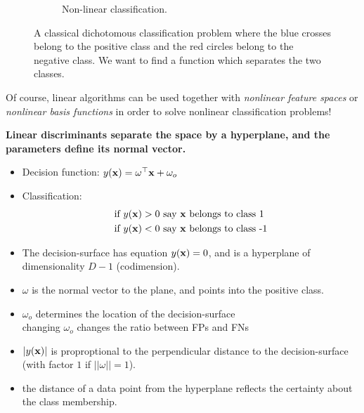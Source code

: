 \begin{figure}
\begin{subfigure}[b]{0.45\textwidth}
		\caption{Non-linear classification.}
	\end{subfigure}
	\caption{A classical dichotomous classification problem where the blue crosses belong to the positive class and the red circles belong to the negative class. We want to find a function which separates the two classes.}
\end{figure}

Of course, linear algorithms can be used together with \emph{nonlinear feature spaces} or \emph{nonlinear basis functions} in order to solve nonlinear classification problems!


\textbf{Linear discriminants separate the space by a hyperplane, and the parameters define its normal vector.} 

\begin{itemize}
\item Decision function: $y({\mathbf{x}})=\omega^\top {\mathbf{x}} + \omega_o$
\item  Classification: \begin{align}
\mbox{if~}y({\mathbf{x}})>0 & \mbox{~say ${\mathbf{x}}$ belongs to class 1}\\
\mbox{if~}y({\mathbf{x}})<0 & \mbox{~say ${\mathbf{x}}$ belongs to class -1}\\
 \end{align}
\item The decision-surface has equation $y({\mathbf{x}})=0$, and is a hyperplane of dimensionality $D-1$ (codimension).
\item  $\omega$ is the normal vector to the plane, and points into the positive class.
\item  $\omega_o$ determines the location of the decision-surface \\
	   changing $\omega_o$ changes the ratio between FPs and FNs
\item  $|y({\mathbf{x}})|$ is proproptional to the perpendicular distance to the decision-surface (with factor $1$ if $|| \omega ||=1$).
\item the distance of a data point from the hyperplane reflects the certainty about the class membership.
\end{itemize}


